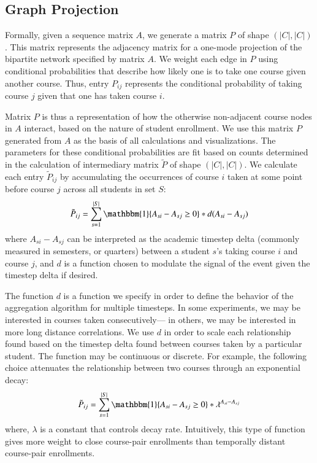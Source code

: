 \documentclass{sigchi}
\begin{document}
\subsection{Graph Projection}
\label{sec:graph_projection}
Formally, given a sequence matrix $A$, we generate a matrix $P$ of shape $(|C|, |C|)$. This matrix represents the adjacency matrix for a one-mode projection of the bipartite network specified by matrix $A$. We weight each edge in $P$ using conditional probabilities that describe how likely one is to take one course given another course. Thus, entry $P_{ij}$ represents the conditional probability of taking course $j$ given that one has taken course $i$.

Matrix $P$ is thus a representation of how the otherwise non-adjacent course nodes in $A$ interact, based on the nature of student enrollment. We use this matrix $P$ generated from $A$ as the basis of all calculations and visualizations. 
 The parameters for these conditional probabilities are fit based on counts determined in the calculation of intermediary matrix $\tilde{P}$ of shape $(|C|, |C|)$. We calculate each entry $\tilde{P}_{ij}$ by accumulating the occurrences of course $i$ taken at some point before course $j$ across all students in set $S$:
\begin{equation}
  \tilde{P}_{ij} = \sum_{s=1}^{|S|} \mathbbm{1}\{A_{si} - A_{sj} \geq 0\}* d(A_{si} - A_{sj})
\end{equation}
where $A_{si} - A_{sj}$ can be interpreted as the academic timestep delta (commonly measured in semesters, or quarters) between a student $s$'s taking course $i$ and course $j$, and $d$ is a function chosen to modulate the signal of the event given the timestep delta if desired.

The function $d$ is a function we specify in order to define the behavior of the aggregation algorithm for multiple timesteps. In some experiments, we may be interested in courses taken consecutively--- in others, we may be interested in more long distance correlations. We use $d$ in order to scale each relationship found based on the timestep delta found between courses taken by a particular student. The function may be continuous or discrete.  For example, the following choice attenuates the relationship between two courses through an
exponential decay:
\begin{equation}
  \tilde{P}_{ij} = \sum_{s=1}^{|S|} \mathbbm{1}\{A_{si} - A_{sj} \geq 0\}* \lambda^{A_{si} - A_{sj}}
\end{equation}
where, $\lambda$ is a constant that controls decay rate. Intuitively, this type of function gives more weight to close course-pair enrollments than temporally distant course-pair enrollments.
\end{document}
